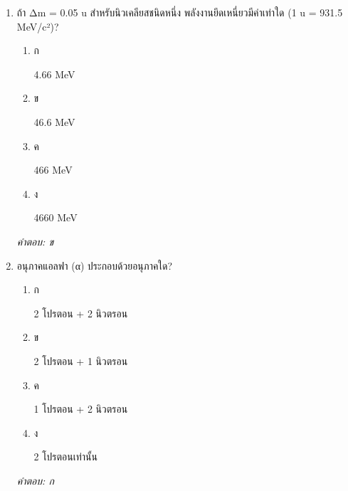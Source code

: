 \documentclass[12pt]{article}
\begin{document}
\begin{enumerate}[label=\arabic*., itemsep=0.5\baselineskip, topsep=0.5\baselineskip, leftmargin=*]
\item ถ้า Δm = 0.05 u สำหรับนิวเคลียสชนิดหนึ่ง พลังงานยึดเหนี่ยวมีค่าเท่าใด (1 u = 931.5 MeV/c²)?
\begin{enumerate}[label=\alph*)., itemsep=0.3\baselineskip, topsep=0.3\baselineskip]
\item ก\ 
\begin{minipage}[t]{0.9\linewidth}
\raggedright 4.66 MeV
\end{minipage}
\item ข\ 
\begin{minipage}[t]{0.9\linewidth}
\raggedright 46.6 MeV
\end{minipage}
\item ค\ 
\begin{minipage}[t]{0.9\linewidth}
\raggedright 466 MeV
\end{minipage}
\item ง\ 
\begin{minipage}[t]{0.9\linewidth}
\raggedright 4660 MeV
\end{minipage}
\end{enumerate}
\vspace{-0.3\baselineskip}
\begin{small}
\textit{คำตอบ: ข}
\end{small}

\item อนุภาคแอลฟา (α) ประกอบด้วยอนุภาคใด?
\begin{enumerate}[label=\alph*)., itemsep=0.3\baselineskip, topsep=0.3\baselineskip]
\item ก\ 
\begin{minipage}[t]{0.9\linewidth}
\raggedright 2 โปรตอน + 2 นิวตรอน
\end{minipage}
\item ข\ 
\begin{minipage}[t]{0.9\linewidth}
\raggedright 2 โปรตอน + 1 นิวตรอน
\end{minipage}
\item ค\ 
\begin{minipage}[t]{0.9\linewidth}
\raggedright 1 โปรตอน + 2 นิวตรอน
\end{minipage}
\item ง\ 
\begin{minipage}[t]{0.9\linewidth}
\raggedright 2 โปรตอนเท่านั้น
\end{minipage}
\end{enumerate}
\vspace{-0.3\baselineskip}
\begin{small}
\textit{คำตอบ: ก}
\end{small}


\end{enumerate}
\end{document}
